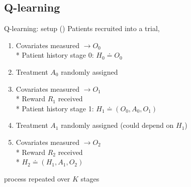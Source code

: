 \documentclass{beamer}
\begin{document}
\subsection{Q-learning} %
\label{sub:q_learning}

\begin{frame}{Q-learning: setup (\cite{dtr-review})}
  Patients recruited into a trial,
  \begin{enumerate}[<+(1)->]
    \item Covariates measured $\rightarrow O_{0}$ \\*
    Patient history stage 0: $H_{0} \doteq O_{0}$
    \item Treatment $A_{0}$ randomly assigned
    \item Covariates measured $\rightarrow O_{1}$ \\*
    Reward $R_{1}$ received \\*
    Patient history stage 1: $H_{1} \doteq (O_{0}, A_{0}, O_{1})$
    \item Treatment $A_{1}$ randomly assigned (could depend on $H_{1}$)
    \item Covariates measured $\rightarrow O_{2}$ \\*
    Reward $R_{2}$ received \\*
    $H_{2} \doteq (H_{1}, A_{1}, O_{2})$
  \end{enumerate}
    \pause
    process repeated over $K$ stages
\end{frame}
\end{document}
